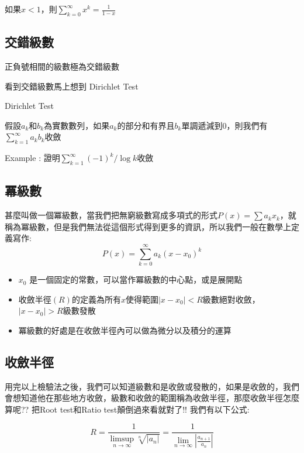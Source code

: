 \documentclass[
]{book}
\providecommand{\tightlist}{%
  \setlength{\itemsep}{0pt}\setlength{\parskip}{0pt}}
\begin{document}
如果\(x<1\)，則\(\sum_{k=0}^{\infty}x^k = \frac{1}{1-x}\)

\hypertarget{ux4ea4ux932fux7d1aux6578}{%
\subsection{交錯級數}\label{ux4ea4ux932fux7d1aux6578}}

正負號相間的級數極為交錯級數

看到交錯級數馬上想到 Dirichlet Test

Dirichlet Test

假設\(a_k\)和\(b_k\)為實數數列，如果\(a_k\)的部分和有界且\(b_k\)單調遞減到0，則我們有\(\sum_{k=1}^{\infty}a_kb_k\)收斂

Example : 證明\(\sum_{k=1}^{\infty}(-1)^k/\log k\)收斂

\hypertarget{ux51aaux7d1aux6578}{%
\subsection{冪級數}\label{ux51aaux7d1aux6578}}

甚麼叫做一個冪級數，當我們把無窮級數寫成多項式的形式\(P(x) = \sum a_kx_k\)，就稱為冪級數，但是我們無法從這個形式得到更多的資訊，所以我們一般在數學上定義寫作:
\[
P(x) = \sum_{k = 0}^{\infty}a_k(x - x_0)^k
\]

\begin{itemize}
\tightlist
\item
  \(x_0\) 是一個固定的常數，可以當作冪級數的中心點，或是展開點
\item
  收斂半徑\((R)\)的定義為所有\(x\)使得範圍\(|x-x_0|<R\)級數絕對收斂，\(|x-x_0|>R\)級數發散
\item
  冪級數的好處是在收斂半徑內可以做為微分以及積分的運算
\end{itemize}

\hypertarget{ux6536ux6582ux534aux5f91}{%
\subsection{收斂半徑}\label{ux6536ux6582ux534aux5f91}}

用完以上檢驗法之後，我們可以知道級數和是收斂或發散的，如果是收斂的，我們會想知道他在那些地方收斂，級數和收斂的範圍稱為收斂半徑，那麼收斂半徑怎麼算呢?? 把Root test和Ratio test顛倒過來看就對了!! 我們有以下公式:

\[R = \frac{1}{\displaystyle\limsup_{n \to \infty}\sqrt[n]{|a_n|}} = \frac{1}{\displaystyle\lim_{n \to \infty}|\frac{a_{n+1}}{a_n}|}\]
\end{document}
